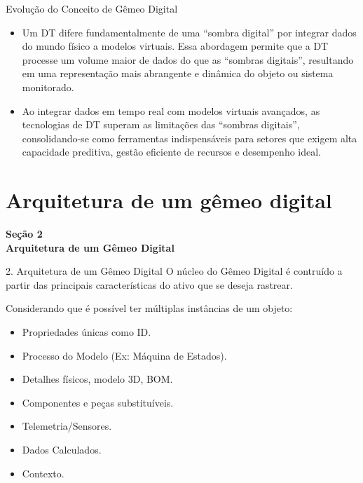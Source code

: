 \documentclass[aspectratio=169,xcolor=dvipsnames]{beamer}
\begin{document}
\begin{frame}{Evolução do Conceito de Gêmeo Digital}
    \begin{itemize}
        \item Um DT difere fundamentalmente de uma “sombra digital” por integrar dados do mundo físico a modelos virtuais. Essa abordagem permite que a DT processe um volume maior de dados do que as “sombras digitais”, resultando em uma representação mais abrangente e dinâmica do objeto ou sistema monitorado.
        \item  Ao integrar dados em tempo real com modelos virtuais avançados, as tecnologias de DT superam as limitações das “sombras digitais”, consolidando-se como ferramentas indispensáveis para setores que exigem alta capacidade preditiva, gestão eficiente de recursos e desempenho ideal.
    \end{itemize}
\end{frame}

\section{Arquitetura de um gêmeo digital}

\begin{frame}[plain]
    \vfill
    \centering
    {\Large\textcolor{dexpiBlue}{\textbf{Seção 2}}}\\[0.8em]
    {\LARGE\textbf{Arquitetura de um Gêmeo Digital}}\\[0.6em]
    \vfill
\end{frame}

\begin{frame}{2. Arquitetura de um Gêmeo Digital}
O núcleo do Gêmeo Digital é contruído a partir das principais características do ativo que se deseja rastrear.

Considerando que é possível ter múltiplas instâncias de um objeto:
\begin{itemize}
    \item Propriedades únicas como ID.
    \item Processo do Modelo (Ex: Máquina de Estados).
    \item Detalhes físicos, modelo 3D, BOM.
    \item Componentes e peças substituíveis.
    \item Telemetria/Sensores.
    \item Dados Calculados.
    \item Contexto.
\end{itemize}


\end{frame}
\end{document}
